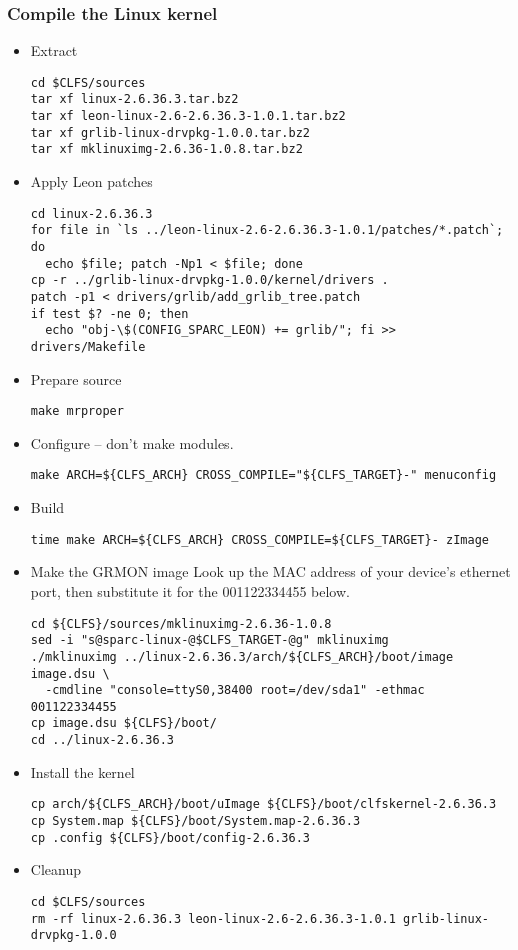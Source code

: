  \subsubsection{Compile the Linux kernel}
 \begin{itemize}
  \item Extract
\begin{lstlisting}
cd $CLFS/sources
tar xf linux-2.6.36.3.tar.bz2
tar xf leon-linux-2.6-2.6.36.3-1.0.1.tar.bz2
tar xf grlib-linux-drvpkg-1.0.0.tar.bz2
tar xf mklinuximg-2.6.36-1.0.8.tar.bz2
\end{lstlisting}
  \item Apply Leon patches
\begin{lstlisting}
cd linux-2.6.36.3
for file in `ls ../leon-linux-2.6-2.6.36.3-1.0.1/patches/*.patch`; do
  echo $file; patch -Np1 < $file; done
cp -r ../grlib-linux-drvpkg-1.0.0/kernel/drivers .
patch -p1 < drivers/grlib/add_grlib_tree.patch
if test $? -ne 0; then
  echo "obj-\$(CONFIG_SPARC_LEON) += grlib/"; fi >> drivers/Makefile
\end{lstlisting}
  \item Prepare source
\begin{lstlisting}
make mrproper
\end{lstlisting}
  \item Configure -- don't make modules.
\begin{lstlisting}
make ARCH=${CLFS_ARCH} CROSS_COMPILE="${CLFS_TARGET}-" menuconfig
\end{lstlisting}
  \item Build
\begin{lstlisting}
time make ARCH=${CLFS_ARCH} CROSS_COMPILE=${CLFS_TARGET}- zImage
\end{lstlisting}
  \item Make the GRMON image
Look up the MAC address of your device's ethernet port, then substitute it for the 001122334455 below.
\begin{lstlisting}
cd ${CLFS}/sources/mklinuximg-2.6.36-1.0.8
sed -i "s@sparc-linux-@$CLFS_TARGET-@g" mklinuximg
./mklinuximg ../linux-2.6.36.3/arch/${CLFS_ARCH}/boot/image image.dsu \
  -cmdline "console=ttyS0,38400 root=/dev/sda1" -ethmac 001122334455
cp image.dsu ${CLFS}/boot/
cd ../linux-2.6.36.3
\end{lstlisting}
  \item Install the kernel
\begin{lstlisting}
cp arch/${CLFS_ARCH}/boot/uImage ${CLFS}/boot/clfskernel-2.6.36.3
cp System.map ${CLFS}/boot/System.map-2.6.36.3
cp .config ${CLFS}/boot/config-2.6.36.3
\end{lstlisting}
  \item Cleanup
\begin{lstlisting}
cd $CLFS/sources
rm -rf linux-2.6.36.3 leon-linux-2.6-2.6.36.3-1.0.1 grlib-linux-drvpkg-1.0.0
\end{lstlisting}
\end{itemize}
